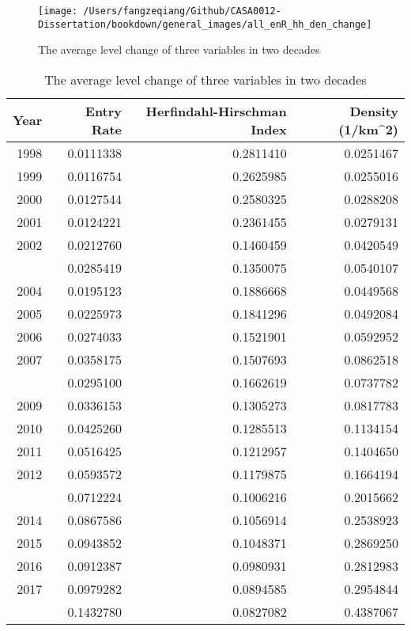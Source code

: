 \documentclass[
  12pt,
  oneside]{book}
\begin{document}
\begin{figure}
\texttt{[image: /Users/fangzeqiang/Github/CASA0012-Dissertation/bookdown/general\_images/all\_enR\_hh\_den\_change]} \caption{The average level change of three variables in two decades}\label{fig:fig-all-var-trend}
\end{figure}

\begin{table}

\caption{\label{tab:tab-all-var-trend}The average level change of three variables in two decades}
\centering
\begin{tabular}[t]{rrrr}
\toprule
\textbf{Year} & \textbf{Entry Rate} & \textbf{Herfindahl-Hirschman Index} & \textbf{Density (1/km\textasciicircum{}2)}\\
\midrule
1998 & 0.0111338 & 0.2811410 & 0.0251467\\
1999 & 0.0116754 & 0.2625985 & 0.0255016\\
2000 & 0.0127544 & 0.2580325 & 0.0288208\\
2001 & 0.0124221 & 0.2361455 & 0.0279131\\
2002 & 0.0212760 & 0.1460459 & 0.0420549\\
\addlinespace
2003 & 0.0285419 & 0.1350075 & 0.0540107\\
2004 & 0.0195123 & 0.1886668 & 0.0449568\\
2005 & 0.0225973 & 0.1841296 & 0.0492084\\
2006 & 0.0274033 & 0.1521901 & 0.0592952\\
2007 & 0.0358175 & 0.1507693 & 0.0862518\\
\addlinespace
2008 & 0.0295100 & 0.1662619 & 0.0737782\\
2009 & 0.0336153 & 0.1305273 & 0.0817783\\
2010 & 0.0425260 & 0.1285513 & 0.1134154\\
2011 & 0.0516425 & 0.1212957 & 0.1404650\\
2012 & 0.0593572 & 0.1179875 & 0.1664194\\
\addlinespace
2013 & 0.0712224 & 0.1006216 & 0.2015662\\
2014 & 0.0867586 & 0.1056914 & 0.2538923\\
2015 & 0.0943852 & 0.1048371 & 0.2869250\\
2016 & 0.0912387 & 0.0980931 & 0.2812983\\
2017 & 0.0979282 & 0.0894585 & 0.2954844\\
\addlinespace
2018 & 0.1432780 & 0.0827082 & 0.4387067\\
\bottomrule
\end{tabular}
\end{table}
\end{document}
